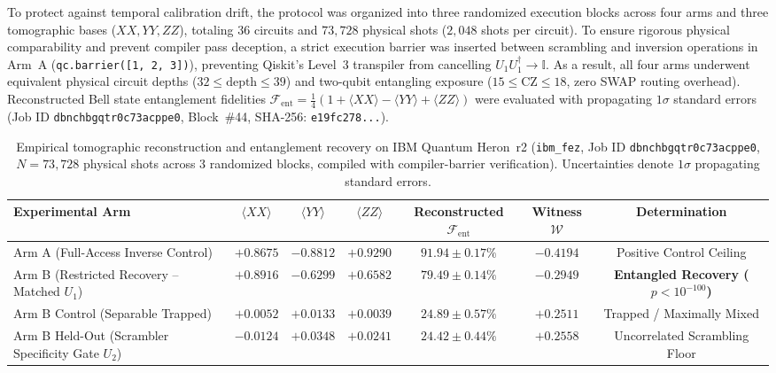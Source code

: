 \documentclass[aps,preprint,superscriptaddress,longbibliography]{revtex4-2}
\begin{document}
To protect against temporal calibration drift, the protocol was organized into three randomized execution blocks across four arms and three tomographic bases ($XX, YY, ZZ$), totaling 36 circuits and $73{,}728$ physical shots ($2{,}048$ shots per circuit). To ensure rigorous physical comparability and prevent compiler pass deception, a strict execution barrier was inserted between scrambling and inversion operations in Arm~A (\texttt{qc.barrier([1, 2, 3])}), preventing Qiskit's Level~3 transpiler from cancelling $U_1 U_1^\dagger \to \mathbb{I}$. As a result, all four arms underwent equivalent physical circuit depths ($32 \le \text{depth} \le 39$) and two-qubit entangling exposure ($15 \le \text{CZ} \le 18$, zero SWAP routing overhead). Reconstructed Bell state entanglement fidelities $\mathcal{F}_{\mathrm{ent}} = \frac{1}{4}(1 + \langle XX \rangle - \langle YY \rangle + \langle ZZ \rangle)$ were evaluated with propagating $1\sigma$ standard errors (Job ID \texttt{dbnchbgqtr0c73acppe0}, Block~\#44, SHA-256: \texttt{e19fc278...}).

\begin{table}[H]
\centering
\caption{Empirical tomographic reconstruction and entanglement recovery on IBM Quantum Heron~r2 (\texttt{ibm\_fez}, Job ID \texttt{dbnchbgqtr0c73acppe0}, $N = 73{,}728$ physical shots across 3 randomized blocks, compiled with compiler-barrier verification). Uncertainties denote $1\sigma$ propagating standard errors.}
\label{tab:hp_three_arm_results}
\begin{tabular}{lcccccc}
\toprule
Experimental Arm & $\langle XX \rangle$ & $\langle YY \rangle$ & $\langle ZZ \rangle$ & Reconstructed $\mathcal{F}_{\mathrm{ent}}$ & Witness $\mathcal{W}$ & Determination \\
\midrule
Arm A (Full-Access Inverse Control) & $+0.8675$ & $-0.8812$ & $+0.9290$ & $\mathbf{91.94 \pm 0.17\%}$ & $-0.4194$ & Positive Control Ceiling \\
Arm B (Restricted Recovery -- Matched $U_1$) & $+0.8916$ & $-0.6299$ & $+0.6582$ & $\mathbf{79.49 \pm 0.14\%}$ & $\mathbf{-0.2949}$ & \textbf{Entangled Recovery ($p < 10^{-100}$)} \\
Arm B Control (Separable Trapped) & $+0.0052$ & $+0.0133$ & $+0.0039$ & $24.89 \pm 0.57\%$ & $+0.2511$ & Trapped / Maximally Mixed \\
Arm B Held-Out (Scrambler Specificity Gate $U_2$) & $-0.0124$ & $+0.0348$ & $+0.0241$ & $24.42 \pm 0.44\%$ & $+0.2558$ & Uncorrelated Scrambling Floor \\
\bottomrule
\end{tabular}
\end{table}
\end{document}
